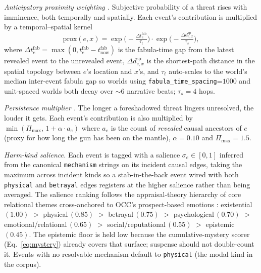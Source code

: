 \documentclass[11pt]{article}
\begin{document}
\emph{Anticipatory proximity weighting \citep{comisky1982suspense}.}
Subjective probability of a threat rises with imminence, both
temporally and spatially. Each event's contribution is multiplied
by a temporal--spatial kernel
\begin{equation}
\mathrm{prox}(e, x) = \exp\!\Big(-\tfrac{\Delta t^{\mathrm{fab}}_e}{\tau_t}\Big)
                    \cdot
                    \exp\!\Big(-\tfrac{\Delta d^{\mathrm{sp}}_{e,x}}{\tau_s}\Big),
\end{equation}
where $\Delta t^{\mathrm{fab}}_e = \max(0, t_e^{\mathrm{fab}} - t_{\mathrm{now}}^{\mathrm{fab}})$
is the fabula-time gap from the latest revealed event to the
unrevealed event, $\Delta d^{\mathrm{sp}}_{e,x}$ is the
shortest-path distance in the spatial topology between $e$'s
location and $x$'s, and $\tau_t$ auto-scales to the world's median
inter-event fabula gap so worlds using
\texttt{fabula\_time\_spacing}=$1000$ and unit-spaced worlds both
decay over $\sim 6$ narrative beats; $\tau_s = 4$ hops.

\emph{Persistence multiplier \citep{brewer1982stories}.} The
longer a foreshadowed threat lingers unresolved, the louder it
gets. Each event's contribution is also multiplied by
$\min(\Pi_{\max},\, 1 + \alpha \cdot a_e)$ where $a_e$ is the
count of \emph{revealed} causal ancestors of $e$ (proxy for how
long the gun has been on the mantle), $\alpha = 0.10$ and
$\Pi_{\max} = 1.5$.

\emph{Harm-kind salience.} Each event is tagged with a salience
$\sigma_e \in [0,1]$ inferred from the canonical
\texttt{mechanism} strings on its incident causal edges, taking
the maximum across incident kinds so a stab-in-the-back event
wired with both \texttt{physical} and \texttt{betrayal} edges
registers at the higher salience rather than being averaged. The
salience ranking follows the appraisal-theory hierarchy of core
relational themes \citep{lazarus1991emotion} cross-anchored to
OCC's prospect-based emotions \citep{ortony1988occ}:
existential\,$(1.00)$ $>$ physical\,$(0.85)$ $>$
betrayal\,$(0.75)$ $>$ psychological\,$(0.70)$ $>$
emotional/relational\,$(0.65)$ $>$ social/reputational\,$(0.55)$
$>$ epistemic\,$(0.45)$. The epistemic floor is held low because
the cumulative-mystery scorer (Eq.~\ref{eq:mystery}) already
covers that surface; suspense should not double-count it. Events
with no resolvable mechanism default to \texttt{physical} (the
modal kind in the corpus).
\end{document}

